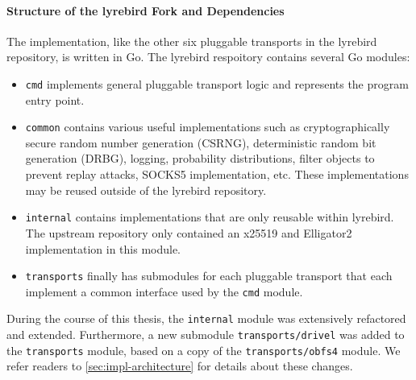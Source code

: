 \paragraph{Structure of the lyrebird Fork and Dependencies}

The \drivel{} implementation, like the other six pluggable transports in the lyrebird repository, is written in Go. The lyrebird respoitory contains several Go modules:
\begin{itemize}
    \item \texttt{cmd} implements general pluggable transport logic and represents the program entry point.
    
    \item \texttt{common} contains various useful implementations such as cryptographically secure random number generation (CSRNG), deterministic random bit generation (DRBG), logging, probability distributions, filter objects to prevent replay attacks, SOCKS5 implementation, etc. These implementations may be reused outside of the lyrebird repository. 
    
    \item \texttt{internal} contains implementations that are only reusable within lyrebird. The upstream repository only contained an x25519 and \textsf{Elligator2}~\cite{CCS:BHKL13} implementation in this module.
    
    \item \texttt{transports} finally has submodules for each pluggable transport that each implement a common interface used by the \texttt{cmd} module. 
\end{itemize}

During the course of this thesis, the \texttt{internal} module was extensively refactored and extended. Furthermore, a new submodule \texttt{transports/drivel} was added to the \texttt{transports} module, based on a copy of the \texttt{transports/obfs4} module. We refer readers to \cref{sec:impl-architecture} for details about these changes.

